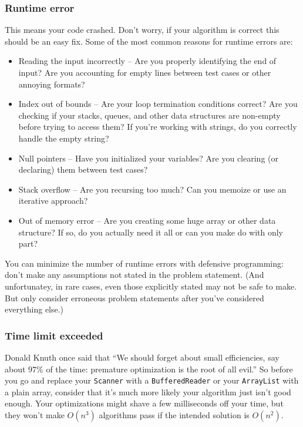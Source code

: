 \documentclass[a4paper,12pt]{article}
\begin{document}
\subsubsection{Runtime error}
This means your code crashed. Don't worry, if your algorithm is correct this should be an easy fix. Some of the most common reasons for runtime errors are:
\begin{itemize}
\item Reading the input incorrectly -- Are you properly identifying the end of input? Are you accounting for empty lines between test cases or other annoying formats?
\item Index out of bounds -- Are your loop termination conditions correct? Are you checking if your stacks, queues, and other data structures are non-empty before trying to access them? If you're working with strings, do you correctly handle the empty string?
\item Null pointers -- Have you initialized your variables? Are you clearing (or declaring) them between test cases?
\item Stack overflow -- Are you recursing too much? Can you memoize or use an iterative approach?
\item Out of memory error -- Are you creating some huge array or other data structure? If so, do you actually need it all or can you make do with only part?
\end{itemize}

You can minimize the number of runtime errors with defensive programming: don't make any assumptions not stated in the problem statement. (And unfortunatey, in rare cases, even those explicitly stated may not be safe to make. But only consider erroneous problem statements after you've considered everything else.)

\subsubsection{Time limit exceeded}
Donald Knuth once said that ``We should forget about small efficiencies, say about $97\%$ of the time: premature optimization is the root of all evil.'' So before you go and replace your \lstinline/Scanner/ with a \lstinline/BufferedReader/ or your \lstinline/ArrayList/ with a plain array, consider that it's much more likely your algorithm just isn't good enough. Your optimizations might shave a few milliseconds off your time, but they won't make $O(n^3)$ algorithms pass if the intended solution is $O(n^2)$.
\end{document}
